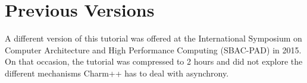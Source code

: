 \documentclass[letterpaper,10pt]{article}
\begin{document}
\section{Previous Versions}
A different version of this tutorial was offered at the International Symposium on Computer Architecture and High Performance Computing (SBAC-PAD) in 2015. On that occasion, the tutorial was compressed to 2 hours and did not explore the different mechanisms Charm++ has to deal with asynchrony. 








%
\end{document}

